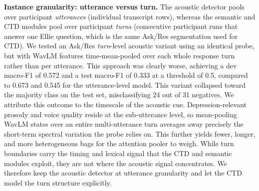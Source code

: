 \documentclass{article}
\begin{document}
\noindent\textbf{Instance granularity: utterance versus turn.} 
The acoustic detector pools over participant \emph{utterances} (individual transcript rows), whereas the semantic and CTD modules pool over participant \emph{turns} (consecutive participant runs that answer one Ellie question, which is the same Ask/Res segmentation used for CTD). 
We tested an Ask/Res \emph{turn}-level acoustic variant using an identical probe, but with WavLM features time-mean-pooled over each whole response turn rather than per utterance. 
This approach was clearly worse, achieving a dev macro-F1 of 0.572 and a test macro-F1 of 0.333 at a threshold of 0.5, compared to 0.673 and 0.545 for the utterance-level model. 
This variant collapsed toward the majority class on the test set, misclassifying 24 out of 31 negatives. 
We attribute this outcome to the timescale of the acoustic cue. 
Depression-relevant prosody and voice quality reside at the sub-utterance level, so mean-pooling WavLM states over an entire multi-utterance turn averages away precisely the short-term spectral variation the probe relies on. 
This further yields fewer, longer, and more heterogeneous bags for the attention pooler to weigh. 
While turn boundaries carry the timing and lexical signal that the CTD and semantic modules exploit, they are not where the acoustic signal concentrates. 
We therefore keep the acoustic detector at utterance granularity and let the CTD model the turn structure explicitly.
\end{document}
